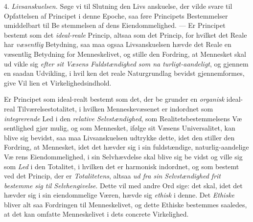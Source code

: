 4. \emph{Livsanskuelsen.} Søge vi til Slutning den Livs\-%
anskuelse, der vilde svare til Opfattelsen af Principet i denne
Epoche, saa føre Principets Bestemmelser umiddelbart til Be\-%
stemmelsen af dens Eiendommelighed. --- Er Principet bestemt
som det \emph{ideal-reale} Princip, altsaa som det Princip, for
hvilket det Reale har \emph{væsentlig} Betydning, saa maa ogsaa
Livsanskuelsen hævde det Reale en væsentlig Betydning for
Menneskelivet, og stille den Fordring, at Mennesket skal ud\-%
vikle sig \emph{efter sit Væsens Fuldstændighed som na\-%
turligt-aandeligt}, og gjennem en saadan Udvikling, i hvil\-%
ken det reale Naturgrundlag bevidst gjennemformes, give Vil\-%
lien et Virkelighedsindhold.

Er Principet som ideal-realt bestemt som det, der be\-%
grunder en \emph{organisk} ideal-real Tilværelsestotalitet, i hvilken
Menneskevæsenet er indordnet som \emph{integrerende} Led i den
\emph{relative Selvstændighed}, som Realitetsbestemmelsens Væ\-%
sentlighed gjør mulig, og som Mennesket, ifølge sit Væsens
Universalitet, kan blive sig bevidst, saa maa Livsanskuelsen
udtrykke dette, idet den stiller den Fordring, at Mennesket,
idet det hævder sig i sin fuldstændige, naturlig-aandelige Væ\-%
rens Eiendommelighed, i sin Selvhævdelse skal blive sig be\-%
vidst og ville sig som \emph{Led} i den Totalitet, i hvilken det er
harmonisk indordnet, og som bestemt ved det Princip, der er
\emph{Totalitetens}, altsaa \emph{ud fra sin Selvstændighed frit
bestemme sig til Selvhengivelse}. Dette vil med andre
Ord sige: det skal, idet det hævder sig i sin eiendommelige
Væren, hævde sig \emph{ethisk} i denne. Det \emph{Ethiske} bliver alt\-%
saa Fordringen til Menneskelivet, og dette Ethiske bestemmes
saaledes, at det kan omfatte Menneskelivet i dets concrete
Virkelighed.

